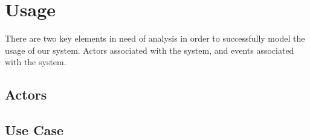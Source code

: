 \section{Usage}

There are two key elements in need of analysis in order to successfully model the usage of our system. Actors associated with the system, and events associated with the system.




\subsection{Actors}
\label{sec:actors}


\subsection{Use Case}
\label{sec:usecase}

